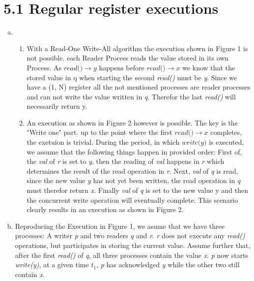 \documentclass{article}
\begin{document}
	\pagestyle{fancy}
	
    \section*{5.1 Regular register executions}
    \begin{enumerate}[a)]
        \item
        \begin{enumerate}[1.]
            \item With a Read-One Write-All algorithm the execution shown in Figure 1 is not possible.
            each Reader Process reads the value stored in its own Process. 
            As $\textit{read()} \rightarrow y$ happens before $\textit{read()} \rightarrow x$ we know that the stored value in q when starting the second \textit{read()} must be \textit{y}.
            Since we have a (1, N) register all the not mentioned processes are reader processes and can not write the value written in \textit{q}. Therefor the last \textit{read()} will necessarily return y.
            \item An execution as shown in Figure 2 however is possible.
	 The key is the "Write one" part. up to the point where the first $\textit{read()} \rightarrow x$ completes, the exetuion is trivial.
	 During the period, in which $\textit{write(y)}$ is executed, we assume that the following things happen in provided order:
	 First of, the \textit{val} of \textit{r} is set to \textit{y}, then the reading of \textit{val} happens in \textit{r} which determines the result of the read operation in \textit{r}.
	 Next, \textit{val} of \textit{q} is read, since the new value \textit{y} has not yet been written, the read operation in \textit{q} must therefor return \textit{x}.
	 Finally \textit{val} of \textit{q} is set to the new value y and then the concurrent write operation will eventually complete.
	 This scenario clearly results in an execution as shown in Figure 2.
        \end{enumerate}
        \item Reproducing the Execution in Figure 1, we asume that we have three processes: A writer \textit{p} and two readers \textit{q} and \textit{r}.
        \textit{r} does not execute any \textit{read()} operations, but participates in storing the current value.
        Assume further that, after the first \textit{read()} of \textit{q}, all three processes contain the value \textit{x}.
        \textit{p} now starts \textit{write(y)}, at a given time $\textit{t}_1$, \textit{p} has acknowledged \textit{y} while the other two still contain \textit{x}.

\end{enumerate}
\end{document}
